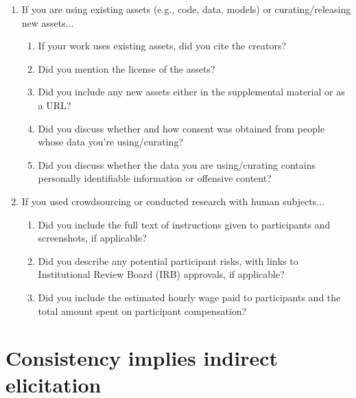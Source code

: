 \documentclass[11pt]{article} %
\newcommand{\Comments}{1}
\newcommand{\mytodo}[2]{\ifnum\Comments=1%
	\todo[linecolor=#1!80!black,backgroundcolor=#1,bordercolor=#1!80!black]{#2}\fi}
\newcommand{\jessiet}[1]{\mytodo{teal!20!white}{JF: #1}}
\renewcommand{\L}{\mathcal{L}}
\begin{document}
\begin{enumerate}
	\item If you are using existing assets (e.g., code, data, models) or curating/releasing new assets...
	\begin{enumerate}
		\item If your work uses existing assets, did you cite the creators?
		\answerNA{}
		\item Did you mention the license of the assets?
		\answerNA{}
		\item Did you include any new assets either in the supplemental material or as a URL?
		\answerNA{}
		\item Did you discuss whether and how consent was obtained from people whose data you're using/curating?
		\answerNA{}
		\item Did you discuss whether the data you are using/curating contains personally identifiable information or offensive content?
		\answerNA{}
	\end{enumerate}
	
	\item If you used crowdsourcing or conducted research with human subjects...
	\begin{enumerate}
		\item Did you include the full text of instructions given to participants and screenshots, if applicable?
		\answerNA{}
		\item Did you describe any potential participant risks, with links to Institutional Review Board (IRB) approvals, if applicable?
		\answerNA{}
		\item Did you include the estimated hourly wage paid to participants and the total amount spent on participant compensation?
		\answerNA{}
	\end{enumerate}
	
\end{enumerate}
\newpage
\appendix
\section{Consistency implies indirect elicitation}\label{sec:consis-implies-indir}


\end{document}
